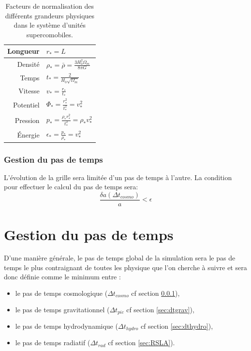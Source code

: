 \begin{table}
\begin{center}
\begin{tabular}{r l} \hline 
Longueur  & $r_*=L$\\ \hline 
Densité & $\rho_* = \bar{\rho} = \frac{3H_0^2 \Omega_m}{8\pi G}$\\ \hline 
Temps & $t_* = \frac{2}{H_0 \sqrt{\Omega_m}}$\\ \hline 
Vitesse & $v_* = \frac{r_*}{t_*}$\\ \hline 
Potentiel & $\Phi_* = \frac{r_*^2}{t_*^2} = v_*^2$\\ \hline 
Pression & $p_* = \frac{\rho_* r_*^2}{t_*^2} = \rho_* v_*^2$\\ \hline 
Énergie & $\epsilon_* = \frac{p_*}{\rho_*} = v_*^2$\\ \hline 
\end{tabular} 
\end{center}
\caption[Facteurs de normalisation]{Facteurs de normalisation des différents grandeurs physiques dans le système d'unités supercomobiles.
\label{tab:comobilfact}}
\end{table}

\subsubsection{Gestion du pas de temps}
\label{sec:dtcosmo}
L'évolution de la grille sera limitée d'un pas de temps à l'autre.
La condition pour effectuer le calcul du pas de temps sera:
\begin{equation}
\frac{\delta a (\Delta t_{cosmo}) } {a} < \epsilon
\end{equation}


\section{Gestion du pas de temps}

D'une manière générale, le pas de temps global de la simulation sera le pas de temps le plus contraignant de toutes les physique que l'on cherche à suivre et sera donc définie comme le minimum entre :

\begin{itemize}
\item le pas de temps cosmologique ($\Delta t_{cosmo}$ cf section \ref{sec:dtcosmo}),
\item le pas de temps gravitationnel ($\Delta t_{pic}$ cf section \ref{sec:dtgrav}),
\item le pas de temps hydrodynamique ($\Delta t_{hydro}$ cf section \ref{sec:dthydro}),
\item le pas de temps radiatif ($\Delta t_{rad}$ cf section \ref{sec:RSLA}).
\end{itemize}


